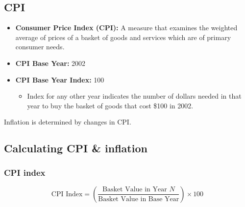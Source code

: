 \subsection{CPI}
\begin{terminology}
    \begin{itemize}
        \item \textbf{Consumer Price Index (CPI):} A measure that examines the weighted average of prices of a basket of goods and services which are of primary consumer needs.
        \item \textbf{CPI Base Year:} 2002
        \item \textbf{CPI Base Year Index:} 100
        \begin{itemize}
            \item Index for any other year indicates the number of dollars needed in that year to buy the basket of goods that cost \$100 in 2002.
        \end{itemize}
    \end{itemize}
\end{terminology}

\begin{warning}
    Inflation is determined by changes in CPI. 
\end{warning}

\subsection{Calculating CPI \& inflation}
\subsubsection{CPI index}
    \begin{definition}
        \begin{equation}
            \text{CPI Index} = \left( \frac{\text{Basket Value in Year } N}{\text{Basket Value in Base Year}} \right) \times 100
        \end{equation}
    \end{definition}

